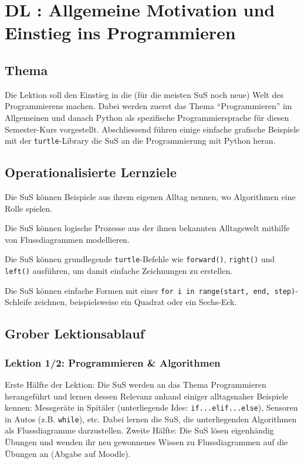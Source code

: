 \section{DL \themycounter: Allgemeine Motivation und Einstieg ins Programmieren}
\begin{myExBox}[title=DL \themycounter]
\subsection*{Thema}
Die Lektion soll den Einstieg in die (für die meisten SuS noch neue) Welt des Programmierens machen. Dabei werden zuerst das Thema \enquote{Programmieren} im Allgemeinen und danach Python als spezifische Programmiersprache für diesen Semester-Kurs vorgestellt. Abschliessend führen einige einfache grafische Beispiele mit der \lstinline|turtle|-Library die SuS an die Programmierung mit Python heran.


\subsection*{Operationalisierte Lernziele}
\begin{todolist}
    \item Die SuS können Beispiele aus ihrem eigenen Alltag nennen, wo Algorithmen eine Rolle spielen.
    \item Die SuS können logische Prozesse aus der ihnen bekannten Alltagswelt mithilfe von Flussdiagrammen modellieren.
    \item Die SuS können grundlegende \lstinline|turtle|-Befehle wie \lstinline|forward()|, \lstinline|right()| und \lstinline|left()| ausführen, um damit einfache Zeichnungen zu erstellen.
    \item Die SuS können einfache Formen mit einer \lstinline|for i in range(start, end, step)|-Schleife zeichnen, beispielsweise ein Quadrat oder ein Sechs-Eck.
\end{todolist}

\subsection*{Grober Lektionsablauf}
\subsubsection*{Lektion 1/2: Programmieren \& Algorithmen}
Erste Hälfte der Lektion: Die SuS werden an das Thema Programmieren herangeführt und lernen dessen Relevanz anhand einiger alltagsnaher Beispiele kennen: Messgeräte in Spitäler (unterliegende Idee: \lstinline|if...elif...else|), Sensoren in Autos (z.B. \lstinline|while|), etc. Dabei lernen die SuS, die unterliegenden Algorithmen als Flussdiagramme darzustellen. Zweite Hälfte: Die SuS lösen eigenhändig Übungen und wenden ihr neu gewonnenes Wissen zu Flussdiagrammen auf die Übungen an (Abgabe auf Moodle).


\end{myExBox}
